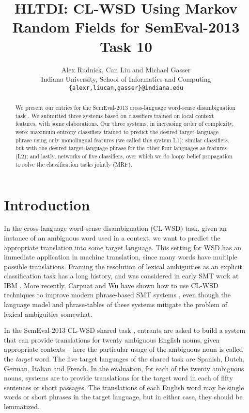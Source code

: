 \documentclass[11pt,letterpaper]{article}
\title{HLTDI: CL-WSD Using Markov Random Fields for SemEval-2013 Task 10}
\author{Alex Rudnick, Can Liu and Michael Gasser\\
	    Indiana University, School of Informatics and Computing \\
	    {\tt \{alexr,liucan,gasser\}@indiana.edu}}
\begin{document}
\maketitle

\begin{abstract}
We present our entries for the SemEval-2013 cross-language word-sense
disambiguation task \cite{task10}. We submitted three systems based on
classifiers trained on local context features, with some elaborations. Our
three systems, in increasing order of complexity, were: maximum entropy
classifiers trained to predict the desired target-language phrase using only
monolingual features (we called this system L1); similar classifiers,
but with the desired target-language phrase for the other four languages as
features (L2); and lastly, networks of five classifiers, over which we
do loopy belief propagation to solve the classification tasks jointly
(MRF).
\end{abstract}

\section{Introduction}
In the cross-language word-sense disambiguation (CL-WSD) task, given an
instance of an ambiguous word used in a context, we want to predict the
appropriate translation into some target language. This setting for WSD has an
immediate application in machine translation, since many words have multiple
possible translations. Framing the resolution of lexical ambiguities as an
explicit classification task has a long history, and was considered in early
SMT work at IBM \cite{Brown91word-sensedisambiguation}. More recently, Carpuat
and Wu have shown how to use CL-WSD techniques to improve modern phrase-based
SMT systems \cite{carpuatpsd}, even though the language model and phrase-tables
of these systems mitigate the problem of lexical ambiguities somewhat.

In the SemEval-2013 CL-WSD shared task \cite{task10}, entrants are asked to
build a system that can provide translations for twenty ambiguous English
nouns, given appropriate contexts -- here the particular usage of the ambiguous
noun is called the \emph{target} word. The five target languages of the shared
task are Spanish, Dutch, German, Italian and French. In the evaluation, for
each of the twenty ambiguous nouns, systems are to provide translations for
the target word in each of fifty sentences or short passages. The translations
of each English word may be single words or short phrases in the target
language, but in either case, they should be lemmatized.
\end{document}
